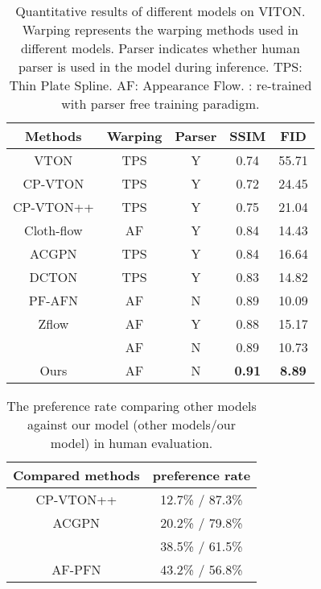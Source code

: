\documentclass[10pt,twocolumn,letterpaper]{article}
\begin{document}
\begin{table}[t]
    \centering
    \small\addtolength{\tabcolsep}{-1pt}
    \begin{tabular}{c|c|c|c|c}
    \toprule
         Methods & Warping& Parser& SSIM & FID\\
         \midrule
         VTON \cite{han2018viton}& TPS& Y &0.74& 55.71\\
         CP-VTON \cite{wang2018toward}&TPS&Y &0.72 &24.45\\
         CP-VTON++ \cite{minar2020cp}& TPS&Y&0.75& 21.04\\
         Cloth-flow\cite{han2019clothflow}&AF&Y&0.84& 14.43\\ 
         ACGPN\cite{yang2020towards}& TPS&Y&0.84& 16.64\\
         DCTON\cite{ge2021disentangled}&TPS&Y& 0.83& 14.82\\
         PF-AFN\cite{ge2021parser} &AF&N&0.89 &10.09\\
         Zflow \cite{chopra2021zflow}&AF&Y&0.88&15.17\\ 
         \cite{han2019clothflow}&AF&N&0.89& 10.73\\
         \midrule
         Ours&AF&N&\textbf{0.91}&\textbf{8.89}\\
         \bottomrule
    \end{tabular}
    \caption{Quantitative results of different models on VITON. Warping represents the warping methods used in different models. Parser indicates whether human parser is used in the model during inference. TPS: Thin Plate Spline. AF: Appearance Flow. : re-trained with parser free training paradigm.}
    \label{tab:tab1}
\end{table}

\begin{table}[t]
    \centering
    \begin{tabular}{c|c}
    \toprule
         Compared methods & preference rate\\
         \midrule
         
         CP-VTON++ \cite{minar2020cp}& 12.7\% / 87.3\%\\
         
         ACGPN\cite{yang2020towards}& 20.2\% / 79.8\%\\
         
         \cite{han2019clothflow}& 38.5\% / 61.5\%\\
         
         AF-PFN\cite{ge2021parser}&43.2\% / 56.8\%\\
         
         \bottomrule
    \end{tabular}
    \vspace{-0.2cm}
    \caption{The preference rate comparing other models against our model (other models/our model) in human evaluation.}
    \label{tab:tab2}
    \vspace{-0.4cm}
\end{table}
\end{document}
